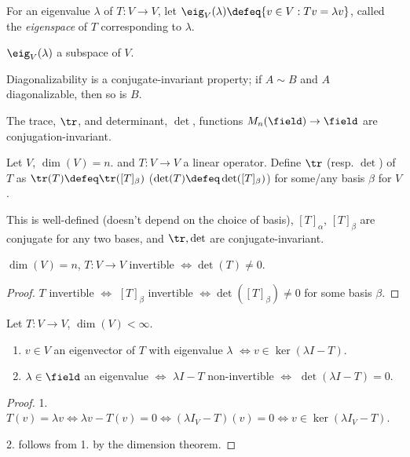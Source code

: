 \begin{definition}[Eigenspace]
    For an eigenvalue $\lambda$ of $T : V \to V$, let $\eig_V(\lambda) \defeq \{v \in V : Tv = \lambda v\}$, called the \emph{eigenspace} of $T$ corresponding to $\lambda$.
\end{definition}

\begin{proposition}
    $\eig_V(\lambda)$ a subspace of $V$.
\end{proposition}

\begin{remark}
Diagonalizability is a conjugate-invariant property; if $A \sim B$ and $A$ diagonalizable, then so is $B$. 
\end{remark}

\begin{proposition}
    The trace, $\tr$, and determinant, $\det$, functions $M_n(\field) \to \field$ are conjugation-invariant.
\end{proposition}

\begin{definition}
    Let $V$, $\dim(V) = n$. and $T: V \to V$ a linear operator. Define $\tr$ (resp. $\det$) of $T$ as $\tr(T) \defeq \tr([T]_\beta)$ ($\det(T) \defeq \det([T]_\beta)$) for some/any basis $\beta$ for $V$.
\end{definition}

\begin{remark}
    This is well-defined (doesn't depend on the choice of basis), $[T]_\alpha$, $[T]_\beta$ are conjugate for any two bases, and $\tr, \det$ are conjugate-invariant.
\end{remark}

\begin{proposition}
    $\dim(V) = n$, $T : V \to V$ invertible $\iff \det(T) \neq 0$.
\end{proposition}
\begin{proof}
    $T$ invertible $\iff$ $[T]_\beta$ invertible $\iff \det([T]_\beta) \neq 0$ for some basis $\beta$.
\end{proof}

\begin{proposition}
    Let $T : V \to V$, $\dim(V) < \infty$.
    \begin{enumerate}
        \item $v \in V$ an eigenvector of $T$ with eigenvalue $\lambda$ $\iff v \in \ker(\lambda I - T)$.
        \item $\lambda \in \field$ an eigenvalue $\iff$ $\lambda I - T$ non-invertible $\iff$ $\det(\lambda I - T) = 0$.
    \end{enumerate}
\end{proposition}

\begin{proof}
    1. $T(v) = \lambda v \iff \lambda v - T(v) = 0 \iff (\lambda I_V - T)(v) = 0 \iff v \in \ker(\lambda I_V - T)$.

2. follows from 1. by the dimension theorem.
\end{proof}